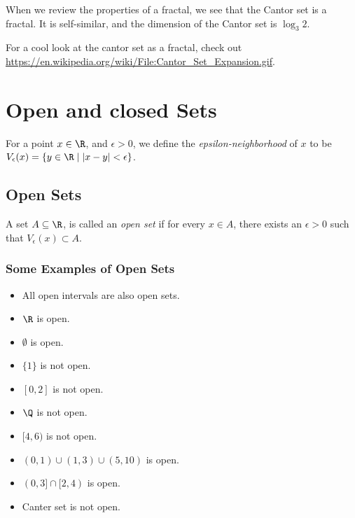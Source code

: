 When we review the properties of a fractal, we see that the Cantor set is a fractal. It is self-similar, and the dimension of the Cantor set is \(\log_3 2\).

\begin{note}
    For a cool look at the cantor set as a fractal, check out \url{https://en.wikipedia.org/wiki/File:Cantor_Set_Expansion.gif}.
\end{note}

\section{Open and closed Sets}

\begin{definition}
    For a point \(x \in \R\), and \(\epsilon > 0\), we define the \textit{epsilon-neighborhood} of \(x\) to be \(V_\epsilon(x) = \{y \in \R \mid |x - y| < \epsilon\}\).
\end{definition}

\subsection{Open Sets}

\begin{definition}
    A set \(A \subseteq \R\), is called an \textit{open set} if for every \(x \in A\), there exists an \(\epsilon > 0\) such that \(V_\epsilon(x) \subset A\).
\end{definition}

\subsubsection{Some Examples of Open Sets}

\begin{multicols}{2}
    \begin{itemize}
        \item All open intervals are also open sets.
        \item \(\R\) is open.
        \item \(\emptyset\) is open.
        \item \(\{1\}\) is not open.
        \item \([0,2]\) is not open.
        \item \(\Q\) is not open.
        \item \([4,6)\) is not open.
        \item \((0,1) \cup (1,3) \cup (5,10)\) is open.
        \item \((0,3] \cap [2,4)\) is open.
        \item Canter set is not open.
    \end{itemize}
\end{multicols}

